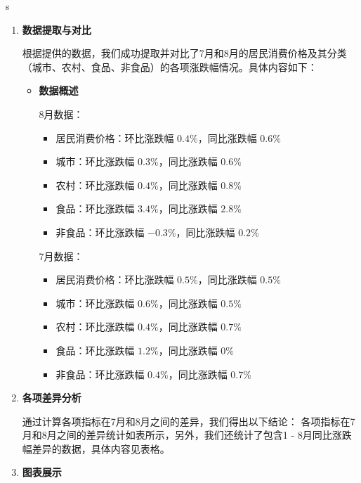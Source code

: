 \begin{gptbox}
s \footnotesize{
    \begin{enumerate}
        \item \noindent\textbf{数据提取与对比}
        
            根据提供的数据，我们成功提取并对比了7月和8月的居民消费价格及其分类（城市、农村、食品、非食品）的各项涨跌幅情况。具体内容如下：
            \begin{itemize}
                \item \noindent\textbf{数据概述}
                
                    8月数据：
                    \begin{itemize}
                        \item 居民消费价格：环比涨跌幅 \(0.4\%\)，同比涨跌幅 \(0.6\%\) 
                        \item 城市：环比涨跌幅 \(0.3\%\)，同比涨跌幅 \(0.6\%\) 
                        \item 农村：环比涨跌幅 \(0.4\%\)，同比涨跌幅 \(0.8\%\) 
                        \item 食品：环比涨跌幅 \(3.4\%\)，同比涨跌幅 \(2.8\%\) 
                        \item 非食品：环比涨跌幅 \(-0.3\%\)，同比涨跌幅 \(0.2\%\) 
                    \end{itemize}
                    7月数据：
                    \begin{itemize}
                        \item 居民消费价格：环比涨跌幅 \(0.5\%\)，同比涨跌幅 \(0.5\%\) 
                        \item 城市：环比涨跌幅 \(0.6\%\)，同比涨跌幅 \(0.5\%\) 
                        \item 农村：环比涨跌幅 \(0.4\%\)，同比涨跌幅 \(0.7\%\) 
                        \item 食品：环比涨跌幅 \(1.2\%\)，同比涨跌幅 \(0\%\) 
                        \item 非食品：环比涨跌幅 \(0.4\%\)，同比涨跌幅 \(0.7\%\) 
                    \end{itemize}
            \end{itemize}
        \item \noindent\textbf{各项差异分析}
        
            通过计算各项指标在7月和8月之间的差异，我们得出以下结论：
            各项指标在7月和8月之间的差异统计如表所示，另外，我们还统计了包含1 - 8月同比涨跌幅差异的数据，具体内容见表格。
        \item \noindent\textbf{图表展示}
        

\end{enumerate}}
\end{gptbox}
